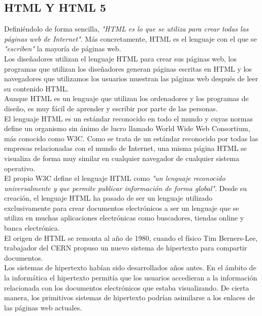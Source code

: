 \subsection{HTML Y HTML 5}

Defini\'endolo de forma sencilla, \textsl{"HTML es lo que se utiliza para crear todas las p\'aginas web de Internet"}. M\'as concretamente, HTML es el lenguaje con el que se \textsl{"escriben"} la mayor\'ia de p\'aginas web.\\

Los dise\~nadores utilizan el lenguaje HTML para crear sus p\'aginas web, los programas que utilizan los dise\~nadores generan p\'aginas escritas en HTML y los navegadores que utilizamos los usuarios muestran las p\'aginas web despu\'es de leer su contenido HTML.\\

Aunque HTML es un lenguaje que utilizan los ordenadores y los programas de dise\~no, es muy f\'acil de aprender y escribir por parte de las personas.\\

El lenguaje HTML es un est\'andar reconocido en todo el mundo y cuyas normas define un organismo sin \'animo de lucro llamado World Wide Web Consortium, m\'as conocido como W3C. Como se trata de un est\'andar reconocido por todas las empresas relacionadas con el mundo de Internet, una misma p\'agina HTML se visualiza de forma muy similar en cualquier navegador de cualquier sistema operativo.\\

El propio W3C define el lenguaje HTML como \textsl{"un lenguaje reconocido universalmente y que permite publicar informaci\'on de forma global"}. Desde su creaci\'on, el lenguaje HTML ha pasado de ser un lenguaje utilizado exclusivamente para crear documentos electr\'onicos a ser un lenguaje que se utiliza en muchas aplicaciones electr\'onicas como buscadores, tiendas online y banca electr\'onica.\\

El origen de HTML se remonta al a\~no de 1980, cuando el f\'isico Tim Berners-Lee, trabajador del CERN propuso un nuevo sistema de hipertexto para compartir documentos.\\

Los sistemas de hipertexto hab\'ian sido desarrollados a\~nos antes. En el \'ambito de la inform\'atica el hipertexto permit\'ia que los usuarios accedieran a la informaci\'on relacionada con los documentos electr\'onicos que estaba visualizando. De cierta manera, los primitivos sistemas de hipertexto podr\'ian asimilarse a los enlaces de las p\'aginas web actuales.\\


